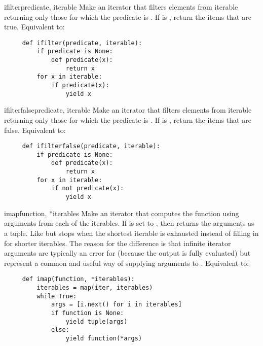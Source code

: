 \begin{funcdesc}{ifilter}{predicate, iterable}
  Make an iterator that filters elements from iterable returning only
  those for which the predicate is .
  If  is , return the items that are true.
  Equivalent to:

  \begin{verbatim}
     def ifilter(predicate, iterable):
         if predicate is None:
             def predicate(x):
                 return x
         for x in iterable:
             if predicate(x):
                 yield x
  \end{verbatim}
\end{funcdesc}

\begin{funcdesc}{ifilterfalse}{predicate, iterable}
  Make an iterator that filters elements from iterable returning only
  those for which the predicate is .
  If  is , return the items that are false.
  Equivalent to:

  \begin{verbatim}
     def ifilterfalse(predicate, iterable):
         if predicate is None:
             def predicate(x):
                 return x
         for x in iterable:
             if not predicate(x):
                 yield x
  \end{verbatim}
\end{funcdesc}

\begin{funcdesc}{imap}{function, *iterables}
  Make an iterator that computes the function using arguments from
  each of the iterables.  If  is set to , then
   returns the arguments as a tuple.  Like
   but stops when the shortest iterable is exhausted
  instead of filling in  for shorter iterables.  The reason
  for the difference is that infinite iterator arguments are typically
  an error for  (because the output is fully evaluated)
  but represent a common and useful way of supplying arguments to
  .
  Equivalent to:

  \begin{verbatim}
     def imap(function, *iterables):
         iterables = map(iter, iterables)
         while True:
             args = [i.next() for i in iterables]
             if function is None:
                 yield tuple(args)
             else:
                 yield function(*args)
  \end{verbatim}
\end{funcdesc}

